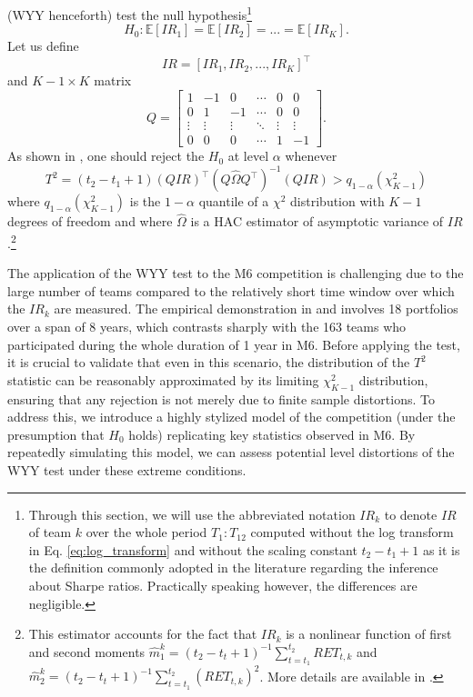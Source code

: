 \documentclass[3p,times,twocolumn]{elsarticle}
\begin{document}
\citet{wrightTestEqualityMultiple2014} (WYY henceforth) test the null hypothesis\footnote{
    Through this section, we will use the abbreviated notation $IR_{k}$ to denote $IR$ of team $k$ over the whole period $T_{1}:T_{12}$ computed without the log transform in Eq. \ref{eq:log_transform} and without the scaling constant $t_{2}-t_{1}+1$ as it is the definition commonly adopted in the literature regarding the inference about Sharpe ratios.
    Practically speaking however, the differences are negligible.
}
\begin{equation}
    H_{0}: \mathbb{E}[IR_{1}] = \mathbb{E}[IR_{2}] = ... = \mathbb{E}[IR_{K}].
\end{equation}
Let us define
\begin{equation}
    IR = [IR_{1}, IR_{2}, ... , IR_{K}]^{\top}
\end{equation}
and $K-1 \times K$ matrix
\begin{equation}
    Q = \left[ \begin{array}{cccccc}
    1 & -1 & 0 & \cdots & 0 & 0\\
    0 & 1 & -1 & \cdots & 0 & 0\\
    \vdots & \vdots & \vdots & \ddots & \vdots & \vdots \\
    0 & 0 & 0 & \cdots & 1 & -1
    \end{array} \right].
\end{equation}
As shown in \citet{wrightTestEqualityMultiple2014}, one should reject the $H_{0}$ at level $\alpha$ whenever
\begin{equation}
    T^2 = (t_{2}-t_{1}+1)(QIR)^{\top}(Q\hat{\Omega} Q^{\top})^{-1}(QIR) > q_{1-\alpha}(\chi^2_{K-1})
\end{equation}
where $q_{1-\alpha}(\chi^2_{K-1})$ is the $1-\alpha$ quantile of a $\chi^2$ distribution with $K-1$ degrees of freedom and where $\hat{\Omega}$ is a HAC estimator of asymptotic variance of $IR$.\footnote{
    This estimator accounts for the fact that $IR_{k}$ is a nonlinear function of first and second moments $\hat{m}_{1}^{k} = (t_{2}-t_{t}+1)^{-1} \sum_{t=t_{1}}^{t_{2}} RET_{t,k}$ and $\hat{m}_{2}^{k} = (t_{2}-t_{t}+1)^{-1} \sum_{t=t_{1}}^{t_{2}} (RET_{t,k})^2$.
    More details are available in \citet{wrightTestEqualityMultiple2014}.
}

The application of the WYY test to the M6 competition is challenging due to the large number of teams compared to the relatively short time window over which the $IR_{k}$ are measured.
The empirical demonstration in \citet{leungTestingEqualityMultiple2008} and \citet{wrightTestEqualityMultiple2014} involves 18 portfolios over a span of 8 years, which contrasts sharply with the 163 teams who participated during the whole duration of 1 year in M6.
Before applying the test, it is crucial to validate that even in this scenario, the distribution of the $T^{2}$ statistic can be reasonably approximated by its limiting $\chi^{2}_{K-1}$ distribution, ensuring that any rejection is not merely due to finite sample distortions.
To address this, we introduce a highly stylized model of the competition (under the presumption that $H_{0}$ holds) replicating key statistics observed in M6.
By repeatedly simulating this model, we can assess potential level distortions of the WYY test under these extreme conditions.
\end{document}
